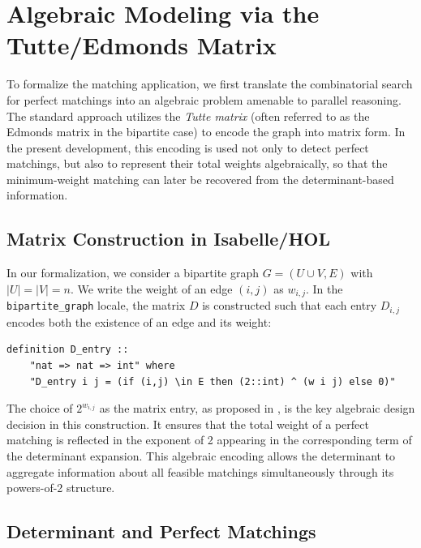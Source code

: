 \section{Algebraic Modeling via the Tutte/Edmonds Matrix}
\label{sec:tutte_matrix}

To formalize the matching application, we first translate the combinatorial search for perfect matchings into an algebraic problem amenable to parallel reasoning.
The standard approach utilizes the \emph{Tutte matrix} \cite{mulmuley1987matching} (often referred to as the Edmonds matrix in the bipartite case) to encode the graph into matrix form.
In the present development, this encoding is used not only to detect perfect matchings, but also to represent their total weights algebraically, so that the minimum-weight matching can later be recovered from the determinant-based information.

\subsection{Matrix Construction in Isabelle/HOL}

In our formalization, we consider a bipartite graph $G = (U \cup V, E)$ with $|U| = |V| = n$.
We write the weight of an edge $(i, j)$ as $w_{i,j}$.
In the \texttt{bipartite\_graph} locale, the matrix $D$ is constructed such that each entry $D_{i,j}$ encodes both the existence of an edge and its weight:

\begin{lstlisting}[language=Isabelle, caption={Matrix Entry Definition}]
definition D_entry :: 
    "nat => nat => int" where
    "D_entry i j = (if (i,j) \in E then (2::int) ^ (w i j) else 0)"
\end{lstlisting}

The choice of $2^{w_{i,j}}$ as the matrix entry, as proposed in \cite{mulmuley1987matching, Gupta2011Lec10}, is the key algebraic design decision in this construction.
It ensures that the total weight of a perfect matching is reflected in the exponent of 2 appearing in the corresponding term of the determinant expansion.
This algebraic encoding allows the determinant to aggregate information about all feasible matchings simultaneously through its powers-of-2 structure.

\subsection{Determinant and Perfect Matchings}

